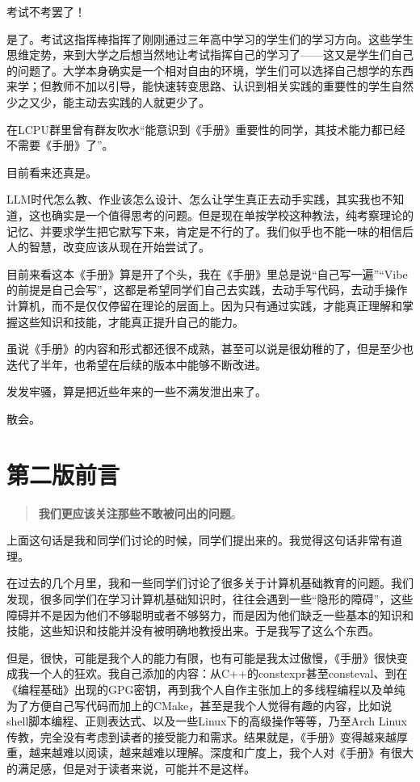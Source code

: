 考试不考罢了！

是了。考试这指挥棒指挥了刚刚通过三年高中学习的学生们的学习方向。这些学生思维定势，来到大学之后想当然地让考试指挥自己的学习了——这又是学生们自己的问题了。大学本身确实是一个相对自由的环境，学生们可以选择自己想学的东西来学；但教师不加以引导，能快速转变思路、认识到相关实践的重要性的学生自然少之又少，能主动去实践的人就更少了。

在LCPU群里曾有群友吹水“能意识到《手册》重要性的同学，其技术能力都已经不需要《手册》了”。

目前看来还真是。

LLM时代怎么教、作业该怎么设计、怎么让学生真正去动手实践，其实我也不知道，这也确实是一个值得思考的问题。但是现在单按学校这种教法，纯考察理论的记忆、并要求学生把它默写下来，肯定是不行的了。我们似乎也不能一味的相信后人的智慧，改变应该从现在开始尝试了。

目前来看这本《手册》算是开了个头，我在《手册》里总是说“自己写一遍”“Vibe的前提是自己会写”，这都是希望同学们自己去实践，去动手写代码，去动手操作计算机，而不是仅仅停留在理论的层面上。因为只有通过实践，才能真正理解和掌握这些知识和技能，才能真正提升自己的能力。

虽说《手册》的内容和形式都还很不成熟，甚至可以说是很幼稚的了，但是至少也迭代了半年，也希望在后续的版本中能够不断改进。

发发牢骚，算是把近些年来的一些不满发泄出来了。

散会。

\chapter{第二版前言}

\begin{quote}
  \textbf{我们更应该关注那些不敢被问出的问题}。
\end{quote}

上面这句话是我和同学们讨论的时候，同学们提出来的。我觉得这句话非常有道理。

在过去的几个月里，我和一些同学们讨论了很多关于计算机基础教育的问题。我们发现，很多同学们在学习计算机基础知识时，往往会遇到一些“隐形的障碍”，这些障碍并不是因为他们不够聪明或者不够努力，而是因为他们缺乏一些基本的知识和技能，这些知识和技能并没有被明确地教授出来。于是我写了这么个东西。

但是，很快，可能是我个人的能力有限，也有可能是我太过傲慢，《手册》很快变成我一个人的狂欢。我自己添加的内容：从C++的constexpr甚至consteval、到在《编程基础》出现的GPG密钥，再到我个人自作主张加上的多线程编程以及单纯为了方便自己写代码而加上的CMake，甚至是我个人觉得有趣的内容，比如说shell脚本编程、正则表达式、以及一些Linux下的高级操作等等，乃至Arch Linux传教，完全没有考虑到读者的接受能力和需求。结果就是，《手册》变得越来越厚重，越来越难以阅读，越来越难以理解。深度和广度上，我个人对《手册》有很大的满足感，但是对于读者来说，可能并不是这样。

